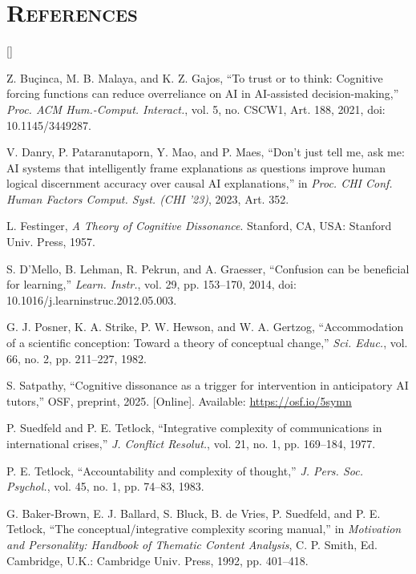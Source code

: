 \documentclass[12pt,letterpaper]{article}
\begin{document}
\section*{\centering\normalsize\scshape References}
\begingroup\footnotesize
\begin{list}{[]}{\setlength{\leftmargin}{2.2em}\setlength{\labelwidth}{1.8em}\setlength{\labelsep}{0.4em}\setlength{\itemsep}{0pt}\setlength{\parsep}{0pt}}
\item Z. Bu\c{c}inca, M. B. Malaya, and K. Z. Gajos, ``To trust or to think: Cognitive forcing functions can reduce overreliance on AI in AI-assisted decision-making,'' \emph{Proc. ACM Hum.-Comput. Interact.}, vol. 5, no. CSCW1, Art. 188, 2021, doi: 10.1145/3449287.
\item V. Danry, P. Pataranutaporn, Y. Mao, and P. Maes, ``Don't just tell me, ask me: AI systems that intelligently frame explanations as questions improve human logical discernment accuracy over causal AI explanations,'' in \emph{Proc. CHI Conf. Human Factors Comput. Syst. (CHI '23)}, 2023, Art. 352.
\item L. Festinger, \emph{A Theory of Cognitive Dissonance}. Stanford, CA, USA: Stanford Univ. Press, 1957.
\item S. D'Mello, B. Lehman, R. Pekrun, and A. Graesser, ``Confusion can be beneficial for learning,'' \emph{Learn. Instr.}, vol. 29, pp. 153--170, 2014, doi: 10.1016/j.learninstruc.2012.05.003.
\item G. J. Posner, K. A. Strike, P. W. Hewson, and W. A. Gertzog, ``Accommodation of a scientific conception: Toward a theory of conceptual change,'' \emph{Sci. Educ.}, vol. 66, no. 2, pp. 211--227, 1982.
\item S. Satpathy, ``Cognitive dissonance as a trigger for intervention in anticipatory AI tutors,'' OSF, preprint, 2025. [Online]. Available: \url{https://osf.io/5symn}
\item P. Suedfeld and P. E. Tetlock, ``Integrative complexity of communications in international crises,'' \emph{J. Conflict Resolut.}, vol. 21, no. 1, pp. 169--184, 1977.
\item P. E. Tetlock, ``Accountability and complexity of thought,'' \emph{J. Pers. Soc. Psychol.}, vol. 45, no. 1, pp. 74--83, 1983.
\item G. Baker-Brown, E. J. Ballard, S. Bluck, B. de Vries, P. Suedfeld, and P. E. Tetlock, ``The conceptual/integrative complexity scoring manual,'' in \emph{Motivation and Personality: Handbook of Thematic Content Analysis}, C. P. Smith, Ed. Cambridge, U.K.: Cambridge Univ. Press, 1992, pp. 401--418.

\end{list}
\end{document}
